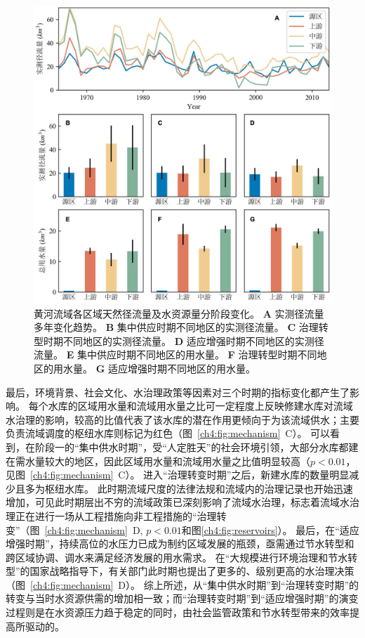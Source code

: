 \begin{figure}[!ht]
	\centering
	\includegraphics[width=\textwidth]{img/ch4/ch4_natural_water.png}
	\caption[黄河流域各区域天然径流量及水资源量分阶段变化]{
        黄河流域各区域天然径流量及水资源量分阶段变化。
        \textbf{A} 实测径流量多年变化趋势。
        \textbf{B} 集中供应时期不同地区的实测径流量。
        \textbf{C} 治理转型时期不同地区的实测径流量。
        \textbf{D} 适应增强时期不同地区的实测径流量。
        \textbf{E} 集中供应时期不同地区的用水量。
        \textbf{F} 治理转型时期不同地区的用水量。
        \textbf{G} 适应增强时期不同地区的用水量。
    }\label{ch4:fig:natural}
\end{figure}

最后，环境背景、社会文化、水治理政策等因素对三个时期的指标变化都产生了影响。
每个水库的区域用水量和流域用水量之比可一定程度上反映修建水库对流域水治理的影响，较高的比值代表了该水库的潜在作用更倾向于为该流域供水；主要负责流域调度的枢纽水库则标记为红色（图~\ref{ch4:fig:mechanism}~C）。
可以看到，在阶段一的“集中供水时期”，受“人定胜天”的社会环境引领，大部分水库都建在需水量较大的地区，因此区域用水量和流域用水量之比值明显较高（$p<0.01$，见图~\ref{ch4:fig:mechanism}~C）。
进入“治理转变时期”之后，新建水库的数量明显减少且多为枢纽水库。
此时期流域尺度的法律法规和流域内的治理记录也开始迅速增加，可见此时期层出不穷的流域政策已深刻影响了流域水治理，标志着流域水治理正在进行一场从工程措施向非工程措施的“治理转变”（图~\ref{ch4:fig:mechanism}~D, $p<0.01$和图\ref{ch4:fig:reservoirs}）。
最后，在“适应增强时期”，持续高位的水压力已成为制约区域发展的瓶颈，亟需通过节水转型和跨区域协调、调水来满足经济发展的用水需求。
在“大规模进行环境治理和节水转型”的国家战略指导下，有关部门此时期也提出了更多的、级别更高的水治理决策（图~\ref{ch4:fig:mechanism}~D）。
综上所述，从“集中供水时期”到“治理转变时期”的转变与当时水资源供需的增加相一致；而“治理转变时期”到“适应增强时期”的演变过程则是在水资源压力趋于稳定的同时，由社会监管政策和节水转型带来的效率提高所驱动的。
